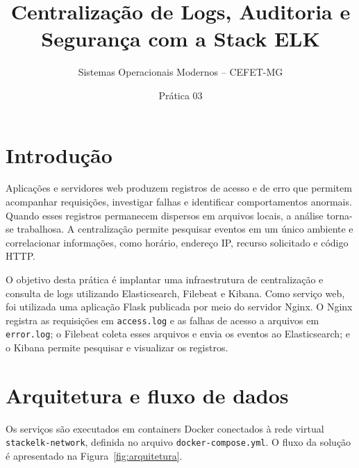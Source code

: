 \documentclass[10pt,a4paper]{article}
\title{Centralização de Logs, Auditoria e Segurança com a Stack ELK}
\author{Sistemas Operacionais Modernos -- CEFET-MG}
\date{Prática 03}
\begin{document}
\maketitle
\vspace{-1.2em}

\section{Introdução}

Aplicações e servidores web produzem registros de acesso e de erro que permitem acompanhar requisições, investigar falhas e identificar comportamentos anormais. Quando esses registros permanecem dispersos em arquivos locais, a análise torna-se trabalhosa. A centralização permite pesquisar eventos em um único ambiente e correlacionar informações, como horário, endereço IP, recurso solicitado e código HTTP.

O objetivo desta prática é implantar uma infraestrutura de centralização e consulta de logs utilizando Elasticsearch, Filebeat e Kibana. Como serviço web, foi utilizada uma aplicação Flask publicada por meio do servidor Nginx. O Nginx registra as requisições em \texttt{access.log} e as falhas de acesso a arquivos em \texttt{error.log}; o Filebeat coleta esses arquivos e envia os eventos ao Elasticsearch; e o Kibana permite pesquisar e visualizar os registros.

\section{Arquitetura e fluxo de dados}

Os serviços são executados em containers Docker conectados à rede virtual \texttt{stackelk-network}, definida no arquivo \texttt{docker-compose.yml}. O fluxo da solução é apresentado na Figura~\ref{fig:arquitetura}.
\end{document}
